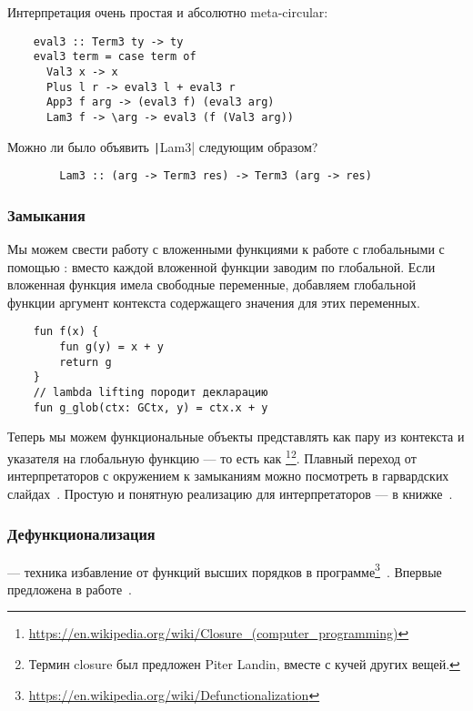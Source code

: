 Интерпретация очень простая и абсолютно meta-circular:
\begin{verbatim}
    eval3 :: Term3 ty -> ty
    eval3 term = case term of
      Val3 x -> x
      Plus l r -> eval3 l + eval3 r
      App3 f arg -> (eval3 f) (eval3 arg)
      Lam3 f -> \arg -> eval3 (f (Val3 arg))
\end{verbatim}

\begin{task}
    Можно ли было объявить \texttt|Lam3| следующим образом?
    \begin{verbatim}
        Lam3 :: (arg -> Term3 res) -> Term3 (arg -> res)
    \end{verbatim}
\end{task}

\subsubsection{Замыкания} \label{subsubsec:closures}

Мы можем свести работу с вложенными функциями к работе с глобальными с помощью : вместо каждой вложенной функции заводим по глобальной.
Если вложенная функция имела свободные переменные, добавляем глобальной функции аргумент контекста содержащего значения для этих переменных.
\begin{verbatim}
    fun f(x) {
        fun g(y) = x + y
        return g
    }
    // lambda lifting породит декларацию
    fun g_glob(ctx: GCtx, y) = ctx.x + y
\end{verbatim}

Теперь мы можем функциональные объекты представлять как пару из контекста и указателя на глобальную функцию --- то есть как \footnote{\url{https://en.wikipedia.org/wiki/Closure_(computer_programming)}}\footnote{Термин closure был предложен Piter Landin, вместе с кучей других вещей.}.
Плавный переход от интерпретаторов с окружением к замыканиям можно посмотреть в гарвардских слайдах~\cite{closures-slides}.
Простую и понятную реализацию для интерпретаторов --- в книжке~\cite[глава 11]{nystrom2021crafting}.

\subsubsection{Дефункционализация} \label{subsubsec:defunctionalization}

 --- техника избавление от функций высших порядков в программе\footnote{\url{https://en.wikipedia.org/wiki/Defunctionalization}}~\cite{defunctionalization-slides}.
Впервые предложена в работе~\cite{reynolds1972definitional, reynolds1998definitional}.

